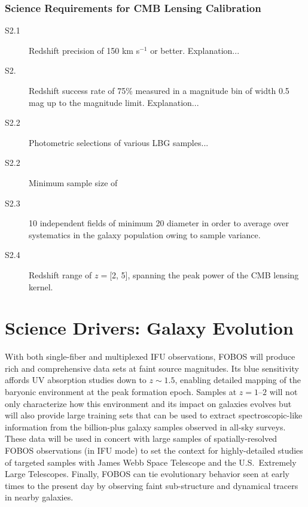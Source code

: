 \documentclass[preprint,11pt]{aastex}
\newcommand{\kms}{{\rm km s$^{-1}$}}
\begin{document}
\subsubsection{Science Requirements for CMB Lensing Calibration}

\begin{description}

\item[S2.1] Redshift precision of 150 \kms{} or better.  Explanation...

\item[S2.]  Redshift success rate of 75\% measured in a magnitude bin of width 0.5 mag up to the magnitude limit.  Explanation...

\item[S2.2] Photometric selections of various LBG samples...

\item[S2.2] Minimum sample size of 

\item[S2.3] 10 independent fields of minimum 20\arcmin{} diameter in order to average over systematics in the galaxy population owing to sample variance.

\item[S2.4] Redshift range of $z = $[2, 5], spanning the peak power of the CMB lensing kernel.

\end{description}



\newpage
\section{Science Drivers: Galaxy Evolution} \label{sci:galaxies}

With both single-fiber and multiplexed IFU observations, FOBOS will produce rich and comprehensive data sets at faint source magnitudes.  Its blue sensitivity affords UV absorption studies down to $z \sim 1.5$, enabling detailed mapping of the baryonic environment at the peak formation epoch.  Samples at $z=1$--$2$ will not only characterize how this environment and its impact on galaxies evolves but will also provide large training sets that can be used to extract spectroscopic-like information from the billion-plus galaxy samples observed in all-sky surveys.  These data will be used in concert with large samples of spatially-resolved FOBOS observations (in IFU mode) to set the context for highly-detailed studies of targeted samples with James Webb Space Telescope and the U.S.~Extremely Large Telescopes.  Finally, FOBOS can tie evolutionary behavior seen at early times to the present day by observing faint sub-structure and dynamical tracers in nearby galaxies.
\end{document}
